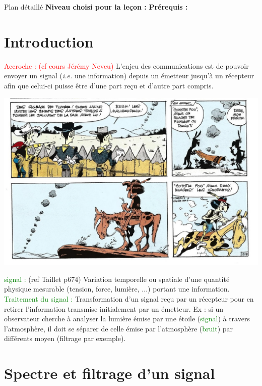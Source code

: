 \begin{reportBlock}{Plan détaillé}
  \textbf{Niveau choisi pour la leçon :} 
  \newline
  \textbf{Prérequis : }
  \newline

\section*{Introduction}
\textcolor{red}{Accroche : (cf cours Jérémy Neveu) }L'enjeu des communications est de pouvoir envoyer un signal (\textit{i.e.} une information) depuis un émetteur jusqu'à un récepteur afin que celui-ci puisse être d'une part reçu et d'autre part compris.
\begin{center}
    \includegraphics[scale=0.8]{LP_TraitementSignal/Codage_LuckyLuke.jpg}
\end{center}
\textcolor{green}{signal :} (ref Taillet p674) Variation temporelle ou spatiale d'une quantité physique mesurable (tension, force, lumière, ...) portant une information.\\
\textcolor{green}{Traitement du signal :} Transformation d'un signal reçu par un récepteur pour en retirer l'information transmise initialement par un émetteur. Ex : si un observateur cherche à analyser la lumière émise par une étoile (\textcolor{green}{signal}) à travers l'atmosphère, il doit se séparer de celle émise par l'atmosphère (\textcolor{green}{bruit}) par différents moyen (filtrage par exemple).

\section{Spectre et filtrage d'un signal}


\end{reportBlock}
